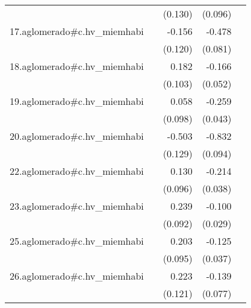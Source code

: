 {\begin{longtable}{l*{4}{D{.}{.}{-1}}}
            &                     &     (0.130)         &     (0.096)         &                     \\
\addlinespace
17.aglomerado#c.hv\_miemhabi&                     &      -0.156         &      -0.478\sym{***}&                     \\
            &                     &     (0.120)         &     (0.081)         &                     \\
\addlinespace
18.aglomerado#c.hv\_miemhabi&                     &       0.182         &      -0.166\sym{**} &                     \\
            &                     &     (0.103)         &     (0.052)         &                     \\
\addlinespace
19.aglomerado#c.hv\_miemhabi&                     &       0.058         &      -0.259\sym{***}&                     \\
            &                     &     (0.098)         &     (0.043)         &                     \\
\addlinespace
20.aglomerado#c.hv\_miemhabi&                     &      -0.503\sym{***}&      -0.832\sym{***}&                     \\
            &                     &     (0.129)         &     (0.094)         &                     \\
\addlinespace
22.aglomerado#c.hv\_miemhabi&                     &       0.130         &      -0.214\sym{***}&                     \\
            &                     &     (0.096)         &     (0.038)         &                     \\
\addlinespace
23.aglomerado#c.hv\_miemhabi&                     &       0.239\sym{**} &      -0.100\sym{***}&                     \\
            &                     &     (0.092)         &     (0.029)         &                     \\
\addlinespace
25.aglomerado#c.hv\_miemhabi&                     &       0.203\sym{*}  &      -0.125\sym{***}&                     \\
            &                     &     (0.095)         &     (0.037)         &                     \\
\addlinespace
26.aglomerado#c.hv\_miemhabi&                     &       0.223         &      -0.139         &                     \\
            &                     &     (0.121)         &     (0.077)         &                     \\

\end{longtable}}
